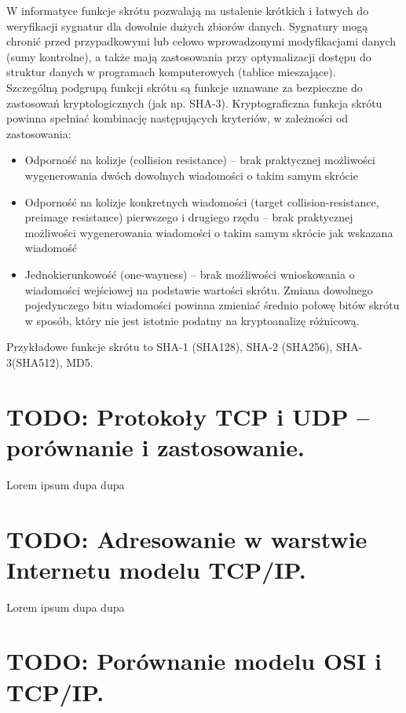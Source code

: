 \documentclass[a4paper,12pt,oneside]{book}
\begin{document}
			W informatyce funkcje skrótu pozwalają na ustalenie krótkich i łatwych do weryfikacji sygnatur dla dowolnie dużych zbiorów danych. Sygnatury mogą chronić przed przypadkowymi lub celowo wprowadzonymi modyfikacjami danych (sumy kontrolne), a także mają zastosowania przy optymalizacji dostępu do struktur danych w programach komputerowych (tablice mieszające).\\
			
			Szczególną podgrupą funkcji skrótu są funkcje uznawane za bezpieczne do zastosowań kryptologicznych (jak np. SHA-3). Kryptograficzna funkcja skrótu powinna spełniać kombinację następujących kryteriów, w zależności od zastosowania:\\
			\begin{itemize}
				\item Odporność na kolizje (collision resistance) – brak praktycznej możliwości wygenerowania dwóch dowolnych wiadomości o takim samym skrócie
				\item Odporność na kolizje konkretnych wiadomości (target collision-resistance, preimage resistance) pierwszego i drugiego rzędu – brak praktycznej możliwości wygenerowania wiadomości o takim samym skrócie jak wskazana wiadomość
				\item Jednokierunkowość (one-wayness) – brak możliwości wnioskowania o wiadomości wejściowej na podstawie wartości skrótu. Zmiana dowolnego pojedynczego bitu wiadomości powinna zmieniać średnio połowę bitów skrótu w sposób, który nie jest istotnie podatny na kryptoanalizę różnicową.
			\end{itemize}
			
			Przykładowe funkcje skrótu to SHA-1 (SHA128), SHA-2 (SHA256), SHA-3(SHA512), MD5.
		
		\setcounter{section}{8}
		\section{\color{red} TODO: Protokoły TCP i UDP – porównanie i zastosowanie.}
		
		Lorem ipsum dupa dupa
		
		\setcounter{section}{9}
		\section{\color{red} TODO: Adresowanie w warstwie Internetu modelu TCP/IP.}
		
		Lorem ipsum dupa dupa
		
		\setcounter{section}{11}
		\section{\color{red} TODO: Porównanie modelu OSI i TCP/IP. }
		
\end{document}
